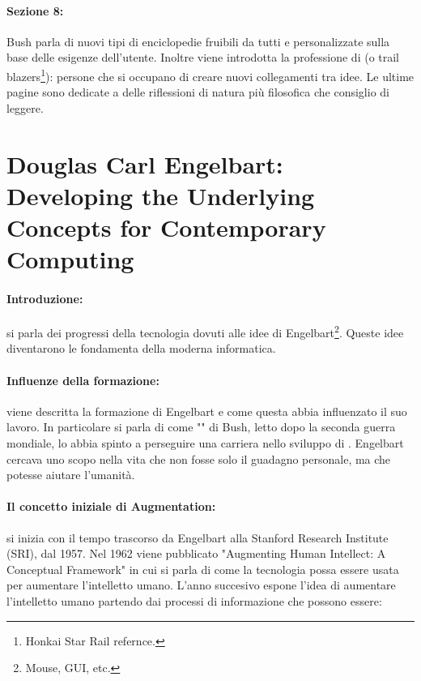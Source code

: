 \paragraph{Sezione 8:} Bush parla di nuovi tipi di enciclopedie fruibili da tutti e personalizzate sulla base 
delle esigenze dell'utente. Inoltre viene introdotta la professione di  (o trail blazers\footnote{Honkai Star Rail refernce.}):
persone che si occupano di creare nuovi collegamenti tra idee. Le ultime pagine sono dedicate a delle riflessioni
di natura più filosofica che consiglio di leggere.

\section{Douglas Carl Engelbart: Developing the Underlying Concepts for Contemporary Computing}

\paragraph{Introduzione:} si parla dei progressi della tecnologia dovuti alle idee di Engelbart\footnote{
    Mouse, GUI, etc.
}. Queste idee diventarono le fondamenta della moderna informatica.

\paragraph{Influenze della formazione:} viene descritta la formazione di Engelbart e come questa abbia influenzato il suo lavoro.
In particolare si parla di come "" di Bush, letto dopo la seconda guerra mondiale, lo abbia 
spinto a perseguire una carriera nello sviluppo di . Engelbart cercava
uno scopo nella vita che non fosse solo il guadagno personale, ma che potesse aiutare l'umanità.

\paragraph{Il concetto iniziale di Augmentation:} si inizia con il tempo trascorso da Engelbart alla Stanford Research Institute (SRI), dal 1957.
Nel 1962 viene pubblicato "Augmenting Human Intellect: A Conceptual Framework" in cui si parla di come la tecnologia
possa essere usata per aumentare l'intelletto umano. L'anno succesivo espone l'idea di aumentare l'intelletto umano
partendo dai processi di informazione che possono essere:

